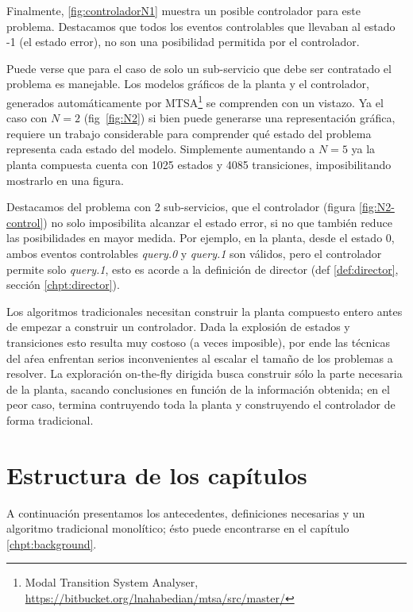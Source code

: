 Finalmente, \ref{fig:controladorN1} muestra un posible controlador para este problema. Destacamos que todos los eventos controlables que llevaban al estado -1 (el estado error), no son una posibilidad permitida por el controlador. 

Puede verse que para el caso de solo un sub-servicio que debe ser contratado el problema es manejable. Los modelos gráficos de la planta y el controlador, generados automáticamente por MTSA\footnote{Modal Transition System Analyser, \href{https://bitbucket.org/lnahabedian/mtsa/src/master/^}{https://bitbucket.org/lnahabedian/mtsa/src/master/}} se comprenden con un vistazo. Ya el caso con $N=2$ (fig~\ref{fig:N2}) si bien puede generarse una representación gráfica, requiere un trabajo considerable para comprender qué estado del problema representa cada estado del modelo. Simplemente aumentando a $N=5$ ya la planta compuesta cuenta con 1025 estados y 4085 transiciones, imposibilitando mostrarlo en una figura. 

Destacamos del problema con 2 sub-servicios, que el controlador (figura \ref{fig:N2-control}) no solo imposibilita alcanzar el estado error, si no que también reduce las posibilidades en mayor medida. Por ejemplo, en la planta, desde el estado 0, ambos eventos controlables \textit{query.0} y \textit{query.1} son válidos, pero el controlador permite solo \textit{query.1}, esto es acorde a la definición de director (def \ref{def:director}, sección \ref{chpt:director}).

Los algoritmos tradicionales necesitan construir la planta compuesto entero antes de empezar a construir un controlador. Dada la explosión de estados y transiciones esto resulta muy costoso (a veces imposible), por ende las técnicas del aŕea enfrentan serios inconvenientes al escalar el tamaño de los problemas a resolver. La exploración on-the-fly dirigida busca construir sólo la parte  necesaria de la planta, sacando conclusiones en función de la información obtenida; en el peor caso, termina contruyendo toda la planta y construyendo el controlador de forma tradicional.

\section{Estructura de los capítulos}

A continuación presentamos los antecedentes, definiciones necesarias y un algoritmo tradicional monolítico; ésto puede encontrarse en el capítulo \ref{chpt:background}.

